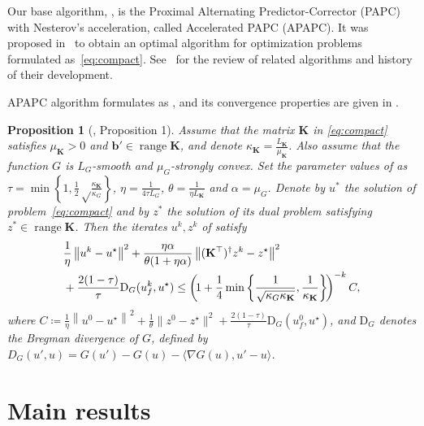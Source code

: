 \documentclass{article}
\newtheorem{proposition}{Proposition}
\DeclareMathOperator{\range}{\mathrm{range}}
\newcommand{\bg}{\mathrm{D}}
\def\<#1,#2>{\langle #1,#2\rangle}
\newcommand{\norm}[1]{\|#1\|}
\newcommand{\sqn}[1]{\norm{#1}^2}
\newcommand{\Norm}[1]{\left\|#1\right\|}
\newcommand{\sqN}[1]{\Norm{#1}^2}
\newcommand{\mK}{\mathbf{K}}
\newcommand{\mb}{\mathbf{b}}
\newcommand{\eqdef}{\coloneqq}
\newcommand{\cbraces}[1]{\left( #1 \right)}
\newcommand{\braces}[1]{\left\{ #1 \right\}}
\begin{document}
Our base algorithm, , is the Proximal Alternating Predictor-Corrector (PAPC) with Nesterov's acceleration, called Accelerated PAPC (APAPC).
It was proposed in~\cite{salim2022optimal} to obtain an optimal algorithm for optimization problems formulated as~\eqref{eq:compact}.
See~\cite{kovalev2020optimal, salim2022dualize} for the review of related algorithms and history of their development.

APAPC algorithm formulates as , and its convergence properties are given in .


\begin{proposition}[\cite{salim2022optimal}, Proposition 1]\label{prop:apapc}
  Assume that the matrix $\mK$ in \eqref{eq:compact} satisfies $\mu_{\mK} > 0$ and $\mb' \in \range \mK$, and denote $\kappa_\mK = \frac{L_\mK}{\mu_\mK}$.
  Also assume that the function $G$ is $L_G$-smooth and $\mu_G$-strongly convex.
  Set the parameter values of  as $\tau = \min\braces{1, \frac12\sqrt\frac{\kappa_\mK}{\kappa_G}}$, $\eta= \frac1{4\tau L_G}$, $\theta = \frac1{\eta L_\mK}$ and $\alpha = \mu_G$.
  Denote by $u^*$ the solution of problem~\eqref{eq:compact} and by $z^*$ the solution of its dual problem satisfying $z^* \in \range \mK$.
  Then the iterates $u^k, z^k$ of  satisfy
    \begin{align}
		&\frac{1}{\eta}\sqN{u^k - u^{\star}} + \frac{\eta\alpha}{\theta(1+\eta\alpha)}\sqN{(\mK^\top)^\dagger z^k - z^{\star}} \\
		&+
			\frac{2(1-\tau)}{\tau}\bg_G(u_f^k, u^{\star})
			\leq
			\cbraces{\!1 + \frac{1}{4}\min\braces{\frac{1}{\sqrt{\kappa_G\kappa_\mK}},\frac{1}{\kappa_\mK}}\!}^{-k}
			C,\notag
		\end{align}
		where
		$C \eqdef \frac{1}{\eta}\sqN{u^0 - u^{\star}} + \frac{1}{\theta}\sqn{z^0 - z^{\star}} +
		\frac{2(1-\tau)}{\tau}\bg_G(u_f^0, u^{\star})$,
    and $\bg_G$ denotes the Bregman divergence of $G$, defined by $D_G(u', u) = G(u') - G(u) - \<\nabla G(u), u' - u>$.
\end{proposition}

\section{Main results}\label{sec:main_results}
\end{document}
